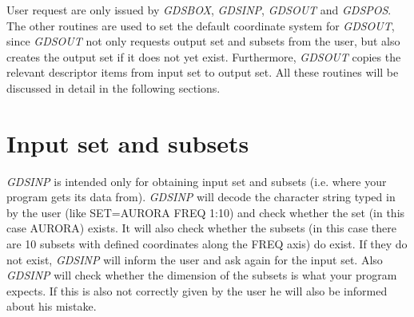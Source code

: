 User request are only issued by {\sl GDSBOX\/}, {\sl GDSINP\/}, {\sl
GDSOUT\/} and {\sl GDSPOS\/}. The other routines are used to set the
default coordinate system for {\sl GDSOUT\/}, since {\sl GDSOUT\/} not
only requests output set and subsets from the user, but also creates the
output set if it does not yet exist. Furthermore, {\sl GDSOUT\/} copies
the relevant descriptor items from input set to output set. All these
routines will be discussed in detail in the following sections.

\section{Input set and subsets}

{\sl GDSINP\/} is intended only for obtaining input set and subsets
(i.e.  where your program gets its data from).  {\sl GDSINP\/} will
decode the character string typed in by the user (like SET=AURORA FREQ
1:10) and check whether the set (in this case AURORA) exists.  It will
also check whether the subsets (in this case there are 10 subsets with
defined coordinates along the FREQ axis) do exist.  If they do not
exist, {\sl GDSINP\/} will inform the user and ask again for the input
set.  Also {\sl GDSINP\/} will check whether the dimension of the
subsets is what your program expects.  If this is also not correctly
given by the user he will also be informed about his mistake.

